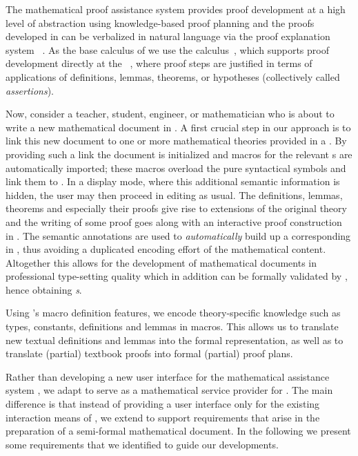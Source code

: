\begin{omgroup}[id=texmacs-omega,short=Proof Assistants in Scientific Editors,
  creators={autexier,benzmueller,fiedler,lesourd}]
The mathematical proof assistance system {\OMEGA} \cite{OMEGA02,SBA-05-a} provides proof
development at a high level of abstraction using knowledge-based proof planning and the
proofs developed in {\OMEGA} can be verbalized in natural language via the proof
explanation system {\prex}~\cite{Fiedler-01-a}.  As the base calculus of {\OMEGA} we use
the {\CORE} calculus~\cite{Aut03,Aut-05-a}, which supports proof development directly at
the {\emph{}}~\cite{Hu-96-a}, where proof steps are justified in
terms of applications of definitions, lemmas, theorems, or hypotheses (collectively called
{\emph{assertions}}).

Now, consider a teacher, student, engineer, or mathematician who is about to write a new
mathematical document in {\texmacs}. A first crucial step in our approach is to link this
new document to one or more mathematical theories provided in a
{}.  By providing such a link the document
is initialized and {\texmacs} macros for the relevant {s}
are automatically imported; these macros overload the pure syntactical symbols and link
them to {}. In a {\texmacs} display mode, where this additional
semantic information is hidden, the user may then proceed in editing
{} as usual.  The definitions, lemmas, theorems and especially
their proofs give rise to extensions of the original theory and the writing of some proof
goes along with an interactive proof construction in {\OMEGA}. The semantic annotations
are used to {\emph{automatically}} build up a corresponding
{} in {\OMEGA}, thus avoiding a duplicated encoding effort
of the mathematical content.  Altogether this allows for the development of mathematical
documents in professional type-setting quality which in addition can be formally validated
by {\OMEGA}, hence obtaining {\emph{s}}.

Using {\texmacs}'s macro definition features, we encode theory-specific knowledge such as
types, constants, definitions and lemmas in macros.  This allows us to translate new
textual definitions and lemmas into the formal representation, as well as to translate
(partial) textbook proofs into formal (partial) proof plans.

Rather than developing a new user interface for the mathematical assistance system
{\OMEGA}, we adapt {\OMEGA} to serve as a mathematical service provider for {\texmacs}.
The main difference is that instead of providing a user interface only for the existing
interaction means of {\OMEGA}, we extend {\OMEGA} to support requirements that arise in
the preparation of a semi-formal mathematical document. In the following we present some
requirements that we identified to guide our
developments.


\end{omgroup}
